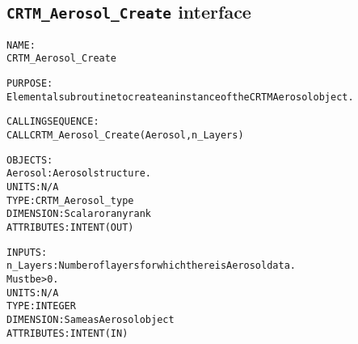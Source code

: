 \subsection{\texttt{CRTM\_Aerosol\_Create} interface}
  \label{sec:CRTM_Aerosol_Create_interface}
  \begin{alltt}
 
  NAME:
        CRTM_Aerosol_Create
 
  PURPOSE:
        Elemental subroutine to create an instance of the CRTM Aerosol object.
 
  CALLING SEQUENCE:
        CALL CRTM_Aerosol_Create( Aerosol, n_Layers )
 
  OBJECTS:
        Aerosol:      Aerosol structure.
                      UNITS:      N/A
                      TYPE:       CRTM_Aerosol_type
                      DIMENSION:  Scalar or any rank
                      ATTRIBUTES: INTENT(OUT)
 
  INPUTS:
        n_Layers:     Number of layers for which there is Aerosol data.
                      Must be > 0.
                      UNITS:      N/A
                      TYPE:       INTEGER
                      DIMENSION:  Same as Aerosol object
                      ATTRIBUTES: INTENT(IN)
 
  \end{alltt}
